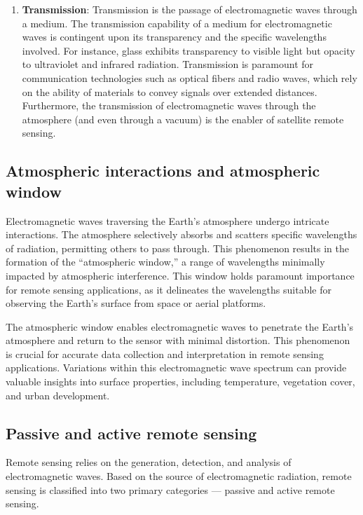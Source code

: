 \documentclass[
  12 pt,
]{Nemilov}
\begin{document}
\begin{enumerate}
\item
  \textbf{Transmission}: Transmission is the passage of electromagnetic waves through a medium. The transmission capability of a medium for electromagnetic waves is contingent upon its transparency and the specific wavelengths involved. For instance, glass exhibits transparency to visible light but opacity to ultraviolet and infrared radiation. Transmission is paramount for communication technologies such as optical fibers and radio waves, which rely on the ability of materials to convey signals over extended distances. Furthermore, the transmission of electromagnetic waves through the atmosphere (and even through a vacuum) is the enabler of satellite remote sensing.
\end{enumerate}

\subsection{Atmospheric interactions and atmospheric window}\label{atm-window}

Electromagnetic waves traversing the Earth's atmosphere undergo intricate interactions. The atmosphere selectively absorbs and scatters specific wavelengths of radiation, permitting others to pass through. This phenomenon results in the formation of the ``atmospheric window,'' a range of wavelengths minimally impacted by atmospheric interference. This window holds paramount importance for remote sensing applications, as it delineates the wavelengths suitable for observing the Earth's surface from space or aerial platforms.

The atmospheric window enables electromagnetic waves to penetrate the Earth's atmosphere and return to the sensor with minimal distortion. This phenomenon is crucial for accurate data collection and interpretation in remote sensing applications. Variations within this electromagnetic wave spectrum can provide valuable insights into surface properties, including temperature, vegetation cover, and urban development.

\subsection{Passive and active remote sensing}\label{passive-and-active-remote-sensing}

Remote sensing relies on the generation, detection, and analysis of electromagnetic waves. Based on the source of electromagnetic radiation, remote sensing is classified into two primary categories --- passive and active remote sensing.
\end{document}
